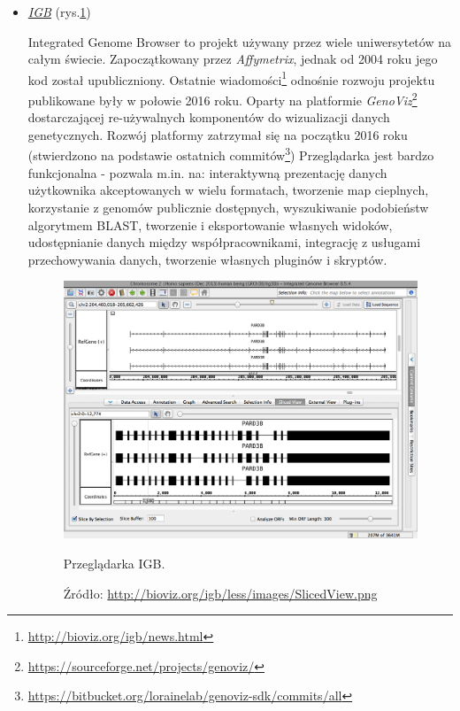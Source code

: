 \begin{itemize}
	\item \href{http://bioviz.org/igb/index.html}{\emph{IGB}} \label{IGB}
	(rys.\ref{img:przegladarka-igb})
	
	
	Integrated Genome Browser to projekt używany przez wiele uniwersytetów na całym świecie. Zapoczątkowany przez \emph{Affymetrix}, jednak od 2004 roku jego kod został upubliczniony. Ostatnie wiadomości\footnote{\url{http://bioviz.org/igb/news.html}} odnośnie rozwoju projektu publikowane były w połowie 2016 roku. Oparty na platformie \textit{GenoViz}\footnote{\url{https://sourceforge.net/projects/genoviz/}} dostarczającej re-używalnych komponentów do wizualizacji danych genetycznych. Rozwój platformy zatrzymał się na początku 2016 roku (stwierdzono na podstawie ostatnich commitów\footnote{\url{https://bitbucket.org/lorainelab/genoviz-sdk/commits/all}}) Przeglądarka jest bardzo funkcjonalna - pozwala m.in. na: interaktywną prezentację danych użytkownika akceptowanych w wielu formatach, tworzenie map cieplnych, korzystanie z genomów publicznie dostępnych, wyszukiwanie podobieństw algorytmem BLAST, tworzenie i eksportowanie własnych widoków, udostępnianie danych między współpracownikami, integrację z usługami przechowywania danych, tworzenie własnych pluginów i skryptów.
	\begin{figure}[h]
		\centering
		\includegraphics[width=1\textwidth]{img/browser-igb.png}
		\caption{Przeglądarka IGB.}
		\vspace{-0.5cm}
		\caption*{\scriptsize Źródło: \url{http://bioviz.org/igb/less/images/SlicedView.png}}
		\label{img:przegladarka-igb}
	\end{figure}
	

\end{itemize}
